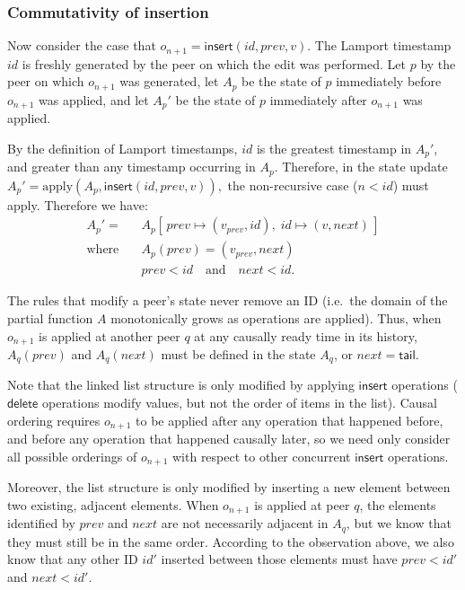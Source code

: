 \documentclass[a4paper,twocolumn,10pt]{article}
\begin{document}
\subsubsection{Commutativity of insertion}

Now consider the case that $o_{n+1}=\mathsf{insert}(\mathit{id}, \mathit{prev}, v)$. The Lamport timestamp $\mathit{id}$ is freshly generated by the peer on which the edit was performed. Let $p$ by the peer on which $o_{n+1}$ was generated, let $A_p$ be the state of $p$ immediately before $o_{n+1}$ was applied, and let $A_p'$ be the state of $p$ immediately after $o_{n+1}$ was applied.

By the definition of Lamport timestamps, $\mathit{id}$ is the greatest timestamp in $A_p'$, and greater than any timestamp occurring in $A_p$. Therefore, in the state update $A_p' = \mathrm{apply}(A_p, \mathsf{insert}(\mathit{id}, \mathit{prev}, v)),$ the non-recursive case ($n < \mathit{id}$) must apply. Therefore we have:
\begin{align*}
A_p' =\; & A_p[\,\mathit{prev} \mapsto (v_\mathit{prev}, \mathit{id}),\; \mathit{id} \mapsto (v, \mathit{next})\,] \\
\text{where}\quad & A_p(\mathit{prev}) = (v_\mathit{prev}, \mathit{next}) \\
& \mathit{prev} < \mathit{id} \quad\text{and}\quad \mathit{next} < \mathit{id}.
\end{align*}

The rules that modify a peer's state never remove an ID (i.e.\ the domain of the partial function $A$ monotonically grows as operations are applied). Thus, when $o_{n+1}$ is applied at another peer $q$ at any causally ready time in its history, $A_q(\mathit{prev})$ and $A_q(\mathit{next})$ must be defined in the state $A_q$, or $\mathit{next} = \mathsf{tail}$.

Note that the linked list structure is only modified by applying $\mathsf{insert}$ operations ($\mathsf{delete}$ operations modify values, but not the order of items in the list). Causal ordering requires $o_{n+1}$ to be applied after any operation that happened before, and before any operation that happened causally later, so we need only consider all possible orderings of $o_{n+1}$ with respect to other concurrent $\mathsf{insert}$ operations.

Moreover, the list structure is only modified by inserting a new element between two existing, adjacent elements. When $o_{n+1}$ is applied at peer $q$, the elements identified by $\mathit{prev}$ and $\mathit{next}$ are not necessarily adjacent in $A_q$, but we know that they must still be in the same order. According to the observation above, we also know that any other ID $\mathit{id}'$ inserted between those elements must have $\mathit{prev} < \mathit{id}'$ and $\mathit{next} < \mathit{id}'$.
\end{document}
